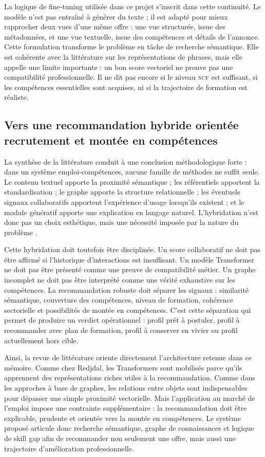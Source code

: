 \documentclass[12pt,twoside]{report}
\newcommand{\NCF}{\textsc{ncf}}
\begin{document}
La logique de fine-tuning utilisée dans ce projet s'inscrit dans cette continuité. Le modèle n'est pas entraîné à générer du texte ; il est adapté pour mieux rapprocher deux vues d'une même offre : une vue structurée, issue des métadonnées, et une vue textuelle, issue des compétences et détails de l'annonce. Cette formulation transforme le problème en tâche de recherche sémantique. Elle est cohérente avec la littérature sur les représentations de phrases, mais elle appelle une limite importante : un bon score vectoriel ne prouve pas une compatibilité professionnelle. Il ne dit pas encore si le niveau \NCF{} est suffisant, si les compétences essentielles sont acquises, ni si la trajectoire de formation est réaliste.

\subsection{Vers une recommandation hybride orientée recrutement et montée en compétences}
La synthèse de la littérature conduit à une conclusion méthodologique forte : dans un système emploi-compétences, aucune famille de méthodes ne suffit seule. Le contenu textuel apporte la proximité sémantique ; les référentiels apportent la standardisation ; le graphe apporte la structure relationnelle ; les éventuels signaux collaboratifs apportent l'expérience d'usage lorsqu'ils existent ; et le module génératif apporte une explication en langage naturel. L'hybridation n'est donc pas un choix esthétique, mais une nécessité imposée par la nature du problème \cite{burke2002hybrid,ricci2011recommender}.

Cette hybridation doit toutefois être disciplinée. Un score collaboratif ne doit pas être affirmé si l'historique d'interactions est insuffisant. Un modèle Transformer ne doit pas être présenté comme une preuve de compatibilité métier. Un graphe incomplet ne doit pas être interprété comme une vérité exhaustive sur les compétences. La recommandation robuste doit séparer les signaux : similarité sémantique, couverture des compétences, niveau de formation, cohérence sectorielle et possibilités de montée en compétences. C'est cette séparation qui permet de produire un verdict opérationnel : profil prêt à postuler, profil à recommander avec plan de formation, profil à conserver en vivier ou profil actuellement hors cible.

Ainsi, la revue de littérature oriente directement l'architecture retenue dans ce mémoire. Comme chez Redjdal, les Transformers sont mobilisés parce qu'ils apprennent des représentations riches utiles à la recommandation. Comme dans les approches à base de graphes, les relations entre objets sont indispensables pour dépasser une simple proximité vectorielle. Mais l'application au marché de l'emploi impose une contrainte supplémentaire : la recommandation doit être explicable, prudente et orientée vers la montée en compétences. Le système proposé articule donc recherche sémantique, graphe de connaissances et logique de skill gap afin de recommander non seulement une offre, mais aussi une trajectoire d'amélioration professionnelle.
\end{document}
